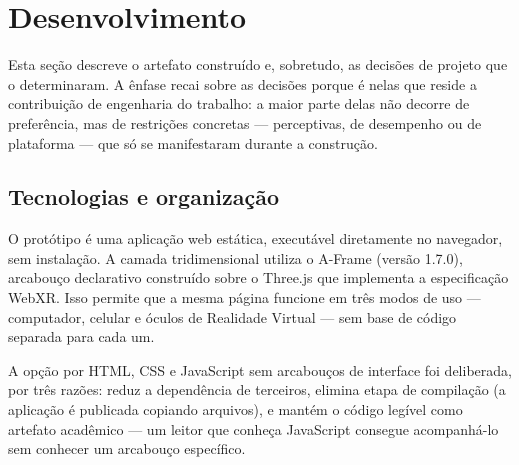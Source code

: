 \section{Desenvolvimento}
\label{sec:desenvolvimento}


Esta seção descreve o artefato construído e, sobretudo, as decisões de
projeto que o determinaram. A ênfase recai sobre as decisões porque é
nelas que reside a contribuição de engenharia do trabalho: a maior parte
delas não decorre de preferência, mas de restrições concretas ---
perceptivas, de desempenho ou de plataforma --- que só se manifestaram
durante a construção.

\subsection{Tecnologias e organização}

O protótipo é uma aplicação web estática, executável diretamente no
navegador, sem instalação. A camada tridimensional utiliza o A-Frame
(versão 1.7.0), arcabouço declarativo construído sobre o Three.js que
implementa a especificação WebXR. Isso permite que a mesma página
funcione em três modos de uso --- computador, celular e óculos de
Realidade Virtual --- sem base de código separada para cada um.

A opção por HTML, CSS e JavaScript sem arcabouços de interface foi
deliberada, por três razões: reduz a dependência de terceiros, elimina
etapa de compilação (a aplicação é publicada copiando arquivos), e
mantém o código legível como artefato acadêmico --- um leitor que
conheça JavaScript consegue acompanhá-lo sem conhecer um arcabouço
específico.

